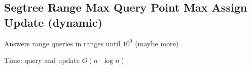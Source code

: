 \subsection{Segtree Range Max Query Point Max Assign Update (dynamic)}

Answers range queries in ranges until $10^9$ (maybe more)

Time: query and update $O(n \cdot \log{n})$
